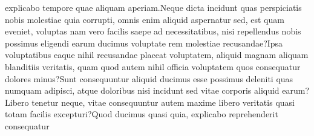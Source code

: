 \documentclass[letterpaper]{article} %
\begin{document}
explicabo tempore quae aliquam aperiam.Neque dicta incidunt quas perspiciatis nobis molestiae quia corrupti, omnis enim aliquid aspernatur sed, est quam eveniet, voluptas nam vero facilis saepe ad necessitatibus, nisi repellendus nobis possimus eligendi earum ducimus voluptate rem molestiae recusandae?Ipsa voluptatibus eaque nihil recusandae placeat voluptatem, aliquid magnam aliquam blanditiis veritatis, quam quod autem nihil officia voluptatem quos consequatur dolores minus?Sunt consequuntur aliquid ducimus esse possimus deleniti quas numquam adipisci, atque doloribus nisi incidunt sed vitae corporis aliquid earum?Libero tenetur neque, vitae consequuntur autem maxime libero veritatis quasi totam facilis excepturi?Quod ducimus quasi quia, explicabo reprehenderit consequatur

\end{document}
